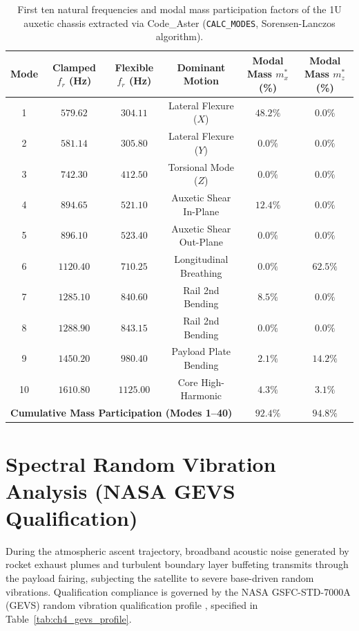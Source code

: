 \begin{table}[htbp]
\centering
\caption{First ten natural frequencies and modal mass participation factors of the 1U auxetic chassis extracted via Code\_Aster (\texttt{CALC\_MODES}, Sorensen-Lanczos algorithm).}
\label{tab:fea_modal_table}
\begin{tabular*}{\textwidth}{@{\extracolsep{\fill}}cccccc@{}}
\toprule
Mode & Clamped $f_r$ (\si{\hertz}) & Flexible $f_r$ (\si{\hertz}) & Dominant Motion & Modal Mass $m_x^*$ (\%) & Modal Mass $m_z^*$ (\%) \\
\midrule
1  & $579.62$ & $304.11$ & Lateral Flexure ($X$) & $48.2\%$ & $0.0\%$ \\
2  & $581.14$ & $305.80$ & Lateral Flexure ($Y$) & $0.0\%$  & $0.0\%$ \\
3  & $742.30$ & $412.50$ & Torsional Mode ($Z$)  & $0.0\%$  & $0.0\%$ \\
4  & $894.65$ & $521.10$ & Auxetic Shear In-Plane& $12.4\%$ & $0.0\%$ \\
5  & $896.10$ & $523.40$ & Auxetic Shear Out-Plane&$0.0\%$  & $0.0\%$ \\
6  & $1120.40$& $710.25$ & Longitudinal Breathing& $0.0\%$  & $62.5\%$ \\
7  & $1285.10$& $840.60$ & Rail 2nd Bending      & $8.5\%$  & $0.0\%$ \\
8  & $1288.90$& $843.15$ & Rail 2nd Bending      & $0.0\%$  & $0.0\%$ \\
9  & $1450.20$& $980.40$ & Payload Plate Bending & $2.1\%$  & $14.2\%$ \\
10 & $1610.80$& $1125.00$& Core High-Harmonic    & $4.3\%$  & $3.1\%$ \\
\midrule
\multicolumn{4}{l}{\textbf{Cumulative Mass Participation (Modes 1--40)}} & $\mathbf{92.4\%}$ & $\mathbf{94.8\%}$ \\
\bottomrule
\end{tabular*}
\end{table}

\section{Spectral Random Vibration Analysis (NASA GEVS Qualification)}
\label{sec:fea_spectral_gevs}

During the atmospheric ascent trajectory, broadband acoustic noise generated by rocket exhaust plumes and turbulent boundary layer buffeting transmits through the payload fairing, subjecting the satellite to severe base-driven random vibrations. Qualification compliance is governed by the NASA GSFC-STD-7000A (GEVS) random vibration qualification profile \cite{nasa2013}, specified in Table~\ref{tab:ch4_gevs_profile}.

